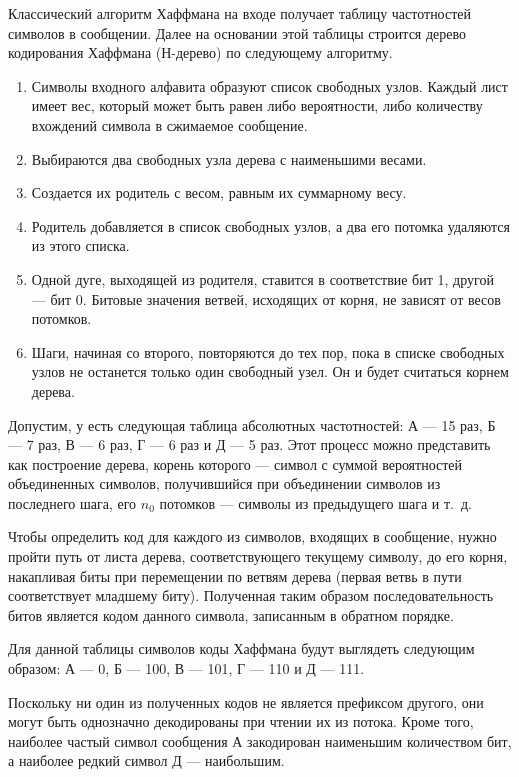 \documentclass{bmstu}
\begin{document}
Классический алгоритм Хаффмана на входе получает таблицу частотностей символов в сообщении. 
Далее на основании этой таблицы строится дерево кодирования Хаффмана (Н-дерево) по следующему алгоритму.
\begin{enumerate}
\item Символы входного алфавита образуют список свободных узлов. 
Каждый лист имеет вес, который может быть равен либо вероятности, либо количеству вхождений символа в сжимаемое сообщение.
\item Выбираются два свободных узла дерева с наименьшими весами.
\item Создается их родитель с весом, равным их суммарному весу.
\item Родитель добавляется в список свободных узлов, а два его потомка удаляются из этого списка.
\item Одной дуге, выходящей из родителя, ставится в соответствие бит 1, другой --- бит 0. 
Битовые значения ветвей, исходящих от корня, не зависят от весов потомков.
\item Шаги, начиная со второго, повторяются до тех пор, пока в списке свободных узлов не останется только один свободный узел. 
Он и будет считаться корнем дерева.
\end{enumerate}

Допустим, у есть следующая таблица абсолютных частотностей: А --- 15 раз, Б --- 7 раз, В --- 6 раз, Г --- 6 раз и Д --- 5 раз. 
Этот процесс можно представить как построение дерева, корень которого --- символ с суммой вероятностей объединенных символов, получившийся при объединении символов из последнего шага, его $n_0$ потомков --- символы из предыдущего шага и т.~д.

Чтобы определить код для каждого из символов, входящих в сообщение, нужно пройти путь от листа дерева, соответствующего текущему символу, до его корня, накапливая биты при перемещении по ветвям дерева (первая ветвь в пути соответствует младшему биту). 
Полученная таким образом последовательность битов является кодом данного символа, записанным в обратном порядке.

Для данной таблицы символов коды Хаффмана будут выглядеть следующим образом: А --- 0, Б --- 100, В --- 101, Г --- 110 и Д --- 111.

Поскольку ни один из полученных кодов не является префиксом другого, они могут быть однозначно декодированы при чтении их из потока. Кроме того, наиболее частый символ сообщения А закодирован наименьшим количеством бит, а наиболее редкий символ Д --- наибольшим.
\end{document}
